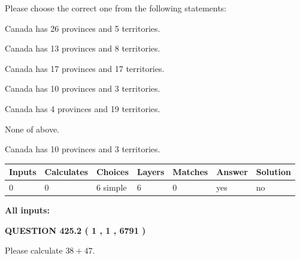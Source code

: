 \documentclass[12pt]{article}
\begin{document}
  
Please choose the correct one from the following statements:
 
 
Canada has  26 provinces and  5 territories.
 
 
Canada has  13 provinces and  8 territories.
 
 
Canada has  17 provinces and  17 territories.
 
 
Canada has 10  provinces and 3 territories.
 
 
Canada has   4 provinces and  19 territories.
 
 
 None of above.
 
 
\noindent{}
 
 
Canada has 10  provinces and 3 territories.
 
 
\noindent{}
 
 
   
   
   
   
\noindent\begin{tabular}{|l|l|l|l|l|l|l|}
 \hline
Inputs & Calculates & Choices & Layers & Matches & Answer & Solution \\ \hline
 0  & 
 0  & 
 6
  simple  
  & 
 6  & 
 0  & 
  yes & 
  no 
  \\ \hline
 \end{tabular}
   
   
   
   
\noindent{}
   
   
   
   
\noindent\vspace{0.1in}\hspace{-0.08in} {\textbf{\Large{All inputs: }}}
   
   
  
\vspace{0.2in}
  
{\textbf{\Large{QUESTION
425.2 
 ( 1 , 1 , 6791 )
}}}
  
  
 
Please calculate $ %
38 +  %
47 $.
 
 
   
\end{document}
